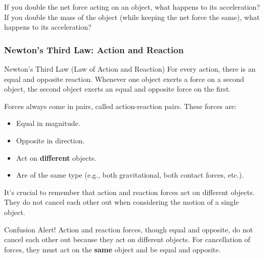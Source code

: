 \begin{stopandthink}
If you double the net force acting on an object, what happens to its acceleration? If you double the mass of the object (while keeping the net force the same), what happens to its acceleration?
\end{stopandthink}

\subsubsection{Newton's Third Law: Action and Reaction}

\begin{keyconcept}{Newton's Third Law (Law of Action and Reaction)}
For every action, there is an equal and opposite reaction.  Whenever one object exerts a force on a second object, the second object exerts an equal and opposite force on the first.
\end{keyconcept}

Forces always come in pairs, called action-reaction pairs.  These forces are:
\begin{itemize}
    \item Equal in magnitude.
    \item Opposite in direction.
    \item Act on \textbf{different} objects.
    \item Are of the same type (e.g., both gravitational, both contact forces, etc.).
\end{itemize}

It's crucial to remember that action and reaction forces act on different objects. They do not cancel each other out when considering the motion of a single object.

\begin{marginnote}
Confusion Alert!  Action and reaction forces, though equal and opposite, do not cancel each other out because they act on different objects.  For cancellation of forces, they must act on the \textbf{same} object and be equal and opposite.
\end{marginnote}

